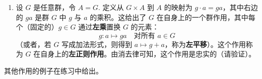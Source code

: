 \begin{example}
\begin{enumerate}[label=(\arabic*)]
当 \( n = 3 \) 时，\( D_6 \) 在三角形三个（标号的）顶点上的作用给出了从 \( D_6 \) 到 \( S_3 \) 的单射同态。
由于这两个群同阶，该映射也必须是满射，即是同构：\( D_6 \cong S_3 \). 
这是我们在前一节通过生成元和关系建立的同一事实的另一个证明。
从几何上看，它说明三角形顶点的任何置换都是一个对称。
对于 \( n \geq 4 \) 的 \( n \) 边形，类似的陈述不成立（仅从阶的考虑，对任何 \( n \geq 4 \) 都不可能让 \( D_{2n} \) 同构于 \( S_n \)）。

\item 设 \( G \) 是任意群，令 \( A = G \). 定义从 \( G \times A \) 到 \( A \) 的映射为 \( g \cdot a = ga \)，其中右边的 \( ga \) 是群 \( G \) 中 \( g \) 与 \( a \) 的乘积。这给出了 \( G \) 在自身上的一个群作用，其中每个（固定的）\( g \in G \) 通过\textbf{左乘}置换 \( G \) 的元素：
\[
g : a \mapsto ga \quad \text{对所有 } a \in G
\]
（或者，若 \( G \) 写成加法形式，则得到 \( a \mapsto g + a \)，称为\textbf{左平移}）。这个作用称为 \( G \) 在自身上的\textbf{左正则作用}。由消去律可知，这个作用是忠实的（请验证）。
\end{enumerate}
\end{example}

其他作用的例子在练习中给出。

